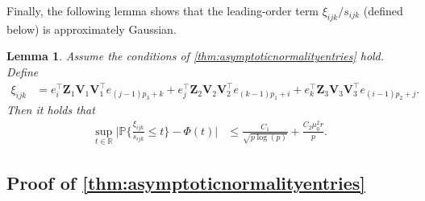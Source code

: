\documentclass[10pt]{article}
\newcommand{\0}{{\mathbf{0}}}
\newcommand{\1}{{\mathbf{1}}}
\renewcommand{\citet}{\cite}
\newtheorem{lemma}{Lemma}
\newcommand{\p}{\mathbb{P}}
\begin{document}



\noindent 
Finally, the following lemma shows that the leading-order term $\xi_{ijk}/s_{ijk}$ (defined below) is approximately Gaussian.
\begin{lemma}\label{lem:xiijkgaussian}
Assume the conditions of \cref{thm:asymptoticnormalityentries} hold. Define 
\begin{align*}
    \xi_{ijk} &=  e_{i}^{\top} \mathbf{Z}_{1} \mathbf{V}_{1} \mathbf{V}_{1}^{\top} e_{(j-1) p_{3}+k}+e_{j}^{\top} \mathbf{Z}_{2} \mathbf{V}_{2} \mathbf{V}_{2}^{\top} e_{(k-1) p_{1}+i}+e_{k}^{\top} \mathbf{Z}_{3} \mathbf{V}_{3} \mathbf{V}_{3}^{\top} e_{(i-1) p_{2}+j}.
\end{align*}
Then it holds that
\begin{align*}
      \sup_{t\in \mathbb{R}}\bigg| \p\bigg\{ \frac{\xi_{ijk}}{s_{ijk}} \leq t \bigg\} - \Phi(t) \bigg| &\leq \frac{C_1}{\sqrt{p\log(p)}} + \frac{C_2 \mu_0^2 r}{p}.
\end{align*}
\end{lemma}




\subsection{Proof of \cref{thm:asymptoticnormalityentries}} \label{sec:entrywiseprooc}
\end{document}

